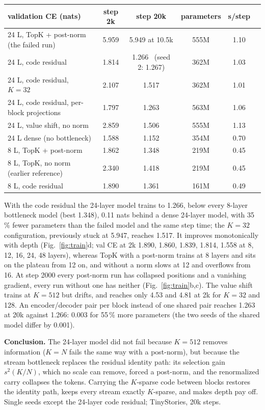 \documentclass[10pt,a4paper]{article}
\begin{document}
\begin{center}\small
\begin{tabular}{lccccc}
\toprule
validation CE (nats) & step 2k & step 20k & parameters & s/step \\
\midrule
24 L, TopK + post-norm (the failed run)          & 5.959 & 5.949 at 10.5k & 555M & 1.10 \\
24 L, code residual                              & 1.814 & 1.266 \ (seed 2: 1.267) & 362M & 1.03 \\
24 L, code residual, \(K=32\)                    & 2.107 & 1.517 & 362M & 1.01 \\
24 L, code residual, per-block projections       & 1.797 & 1.263 & 563M & 1.06 \\
24 L, value shift, no norm                       & 2.859 & 1.506 & 555M & 1.13 \\
24 L dense (no bottleneck)                       & 1.588 & 1.152 & 354M & 0.70 \\
8 L, TopK + post-norm                            & 1.862 & 1.348 & 219M & 0.45 \\
8 L, TopK, no norm (earlier reference)           & 2.340 & 1.418 & 219M & 0.45 \\
8 L, code residual                               & 1.890 & 1.361 & 161M & 0.49 \\
\bottomrule
\end{tabular}
\end{center}

With the code residual the 24-layer model trains to 1.266, below every 8-layer bottleneck model (best 1.348),
0.11 nats behind a dense 24-layer model, with 35\,\% fewer parameters than the failed model and the same step
time; the \(K=32\) configuration, previously stuck at 5.947, reaches 1.517.  It improves monotonically with depth
(Fig.~\ref{fig:train}d; val CE at 2k 1.890, 1.860, 1.839, 1.814, 1.558 at 8, 12, 16, 24, 48 layers), whereas TopK with
a post-norm trains at 8 layers and sits on the plateau from 12 on, and without a norm slows at 12 and overflows
from 16.  At step 2000 every post-norm run has collapsed positions and a vanishing gradient, every run without
one has neither (Fig.~\ref{fig:train}b,c).  The value shift trains at \(K=512\) but drifts, and reaches only 4.53 and
4.81 at 2k for \(K=32\) and 128.  An encoder/decoder pair per block instead of one shared pair reaches 1.263
at 20k against 1.266: 0.003 for 55\,\% more parameters (the two seeds of the shared model differ by 0.001).

\textbf{Conclusion.}  The 24-layer model did not fail because \(K=512\) removes information (\(K=N\) fails the same
way with a post-norm), but because the stream bottleneck replaces the residual identity path: its selection gain
\(s^2(K/N)\), which no scale can remove, forced a post-norm, and the renormalized carry collapses the tokens.  Carrying
the \(K\)-sparse code between blocks restores the identity path, keeps every stream exactly \(K\)-sparse, and makes
depth pay off.  Single seeds except the 24-layer code residual; TinyStories, 20k steps.
\end{document}
